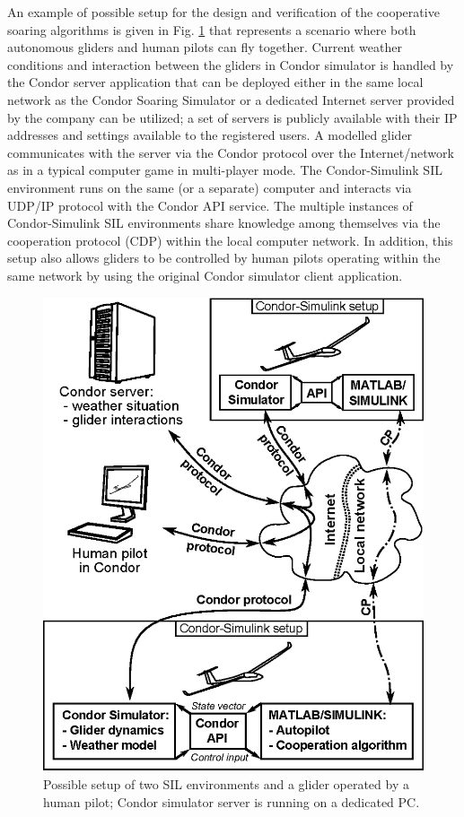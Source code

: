 \documentclass[letterpaper, 10 pt, conference]{ieeeconf}  %
\begin{document}
An example of possible setup for the design and verification of the cooperative soaring algorithms is given in Fig. \ref{fig:DevEnv} that represents a scenario where both autonomous gliders and human pilots can fly together. Current weather conditions and interaction between the gliders in Condor simulator is handled by the Condor server application that can be deployed either in the same local network as the Condor Soaring Simulator or a dedicated Internet server provided by the company can be utilized; a set of servers is publicly available with their IP addresses and settings available to the registered users. A modelled glider communicates with the server via the Condor protocol over the Internet/network as in a typical computer game in multi-player mode. The Condor-Simulink SIL environment runs on the same (or a separate) computer and interacts via UDP/IP protocol with the Condor API service. The multiple instances of Condor-Simulink SIL environments share knowledge among themselves via the cooperation protocol (CDP) within the local computer network. In addition, this setup also allows gliders to be controlled by human pilots operating within the same network by using the original Condor simulator client application.

\begin{figure}[thpb]
  \centering
  \includegraphics[scale=0.5]{Figures/dev_env_.eps}
  \caption{Possible setup of two SIL environments and a glider operated by a human pilot; Condor simulator server is running on a dedicated PC.}
  \label{fig:DevEnv}
\end{figure}
\end{document}
